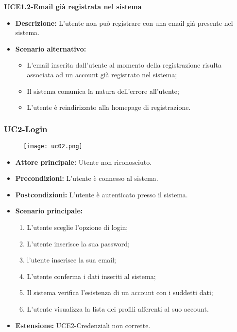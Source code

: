 \pagebreak

\textbf{UCE1.2-Email già registrata nel sistema}
\begin{itemize}
    \item \textbf{Descrizione: }L'utente non può registrare con una email già presente nel sistema.
    \item \textbf{Scenario alternativo:}
    \begin{itemize}
        \item L'email inserita dall'utente al momento della registrazione risulta associata ad un
        account già registrato nel sistema;
        \item Il sistema comunica la natura dell'errore all'utente;
        \item L'utente è reindirizzato alla homepage di registrazione.
    \end{itemize}
\end{itemize}

\subsubsection{UC2-Login}
\begin{figure}[h] \texttt{[image: uc02.png]} \end{figure}
\begin{itemize}
\item \textbf{Attore principale:} Utente non riconosciuto.
\item \textbf{Precondizioni:} L'utente è connesso al sistema.
\item \textbf{Postcondizioni:} L'utente è autenticato presso il sistema.
\item \textbf{Scenario principale:}
\begin{enumerate}
    \item L'utente sceglie l'opzione di login;
    \item L'utente inserisce la sua password;
    \item l'utente inserisce la sua email;
    \item L'utente conferma i dati inseriti al sistema;
    \item Il sistema verifica l'esistenza di un account con i suddetti dati;
    \item L'utente visualizza la lista dei profili afferenti al suo account.
\end{enumerate}
    \item \textbf{Estensione: }UCE2-Credenziali non corrette.
\end{itemize}

